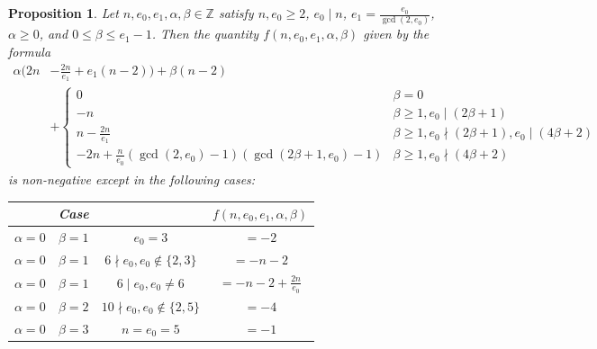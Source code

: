 \documentclass[12pt]{amsart}
\numberwithin{equation}{section}
\newtheorem{prop}[equation]{Proposition}
\theoremstyle{definition}
\newcommand{\Z}{\mathbb Z}
\begin{document}
\begin{prop}\label{prop: proof of positivity for type I}
    Let $n,e_0,e_1,\alpha,\beta\in\Z$ satisfy $n,e_0\geq 2$, $e_0\mid n$, $e_1=\frac{e_0}{\gcd(2,e_0)}$, $\alpha\geq 0$, and $0\leq \beta\leq e_1-1$. Then the quantity $f(n,e_0,e_1,\alpha,\beta)$ given by the formula
    \begin{align*}
        \alpha(2n&-\frac{2n}{e_1}+e_1(n-2))+\beta(n-2)\\
        &+ \begin{cases}
            0&\beta=0\\
            -n&\beta\geq1,e_0\mid (2\beta+1)\\
            n-\frac{2n}{e_1}&\beta\geq1,e_0\nmid (2\beta+1),e_0\mid (4\beta+2)\\
            -2n+\frac{n}{e_0}(
            \gcd(2,e_0)-1)(\gcd(2\beta+1,e_0)-1)&\beta\geq1,e_0\nmid (4\beta+2)\end{cases}
    \end{align*}
    is non-negative except in the following cases: 
    \begin{table}[h!]
    \centering
    \renewcommand{\arraystretch}{1.4}
    \begin{tabular}{|ccc|c|}
        \hline
        & \textbf{\textup{Case}} &  & $f(n,e_0,e_1,\alpha,\beta)$ \\
        \hline
        $\alpha=0$ & $\beta=1$ & $e_0=3$ & $=-2$\\
        \hline
        $\alpha=0$ & $\beta=1$ & $6\nmid e_0,e_0\not\in\{2,3\}$ & $=-n-2$ \\
        \hline
        $\alpha=0$ & $\beta=1$ & $6\mid e_0,e_0\neq 6$ & $= -n-2+\frac{2n}{e_0}$ \\
        \hline
        $\alpha=0$ & $\beta=2$ & $10\nmid e_0,e_0\not\in\{2,5\}$ & $=-4$ \\
        \hline
        $\alpha=0$ & $\beta=3$ & $n=e_0=5$ & $=-1$ \\
        \hline
    \end{tabular}
    \end{table}
\end{prop}
\end{document}
